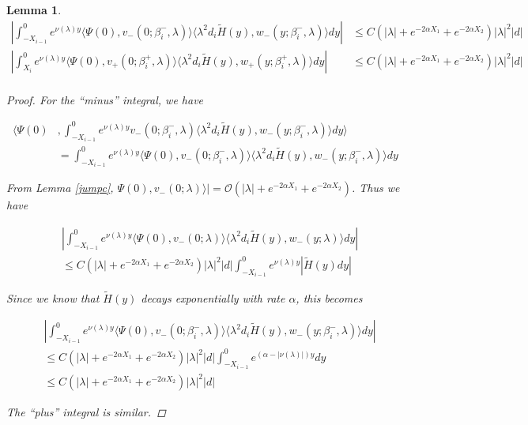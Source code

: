 \documentclass[12pt]{article}
\newtheorem{lemma}{Lemma}
\begin{document}
\begin{lemma}

\begin{align*}
\left| \int_{-X_{i-1}}^0
e^{\nu(\lambda)y} \langle \Psi(0), v_-(0; \beta_i^-, \lambda) \rangle \langle \lambda^2 d_i \tilde{H}(y), w_-(y; \beta_i^-, \lambda) \rangle dy \right| &\leq C (|\lambda| + e^{-2 \alpha X_1} + e^{-2 \alpha X_2} ) |\lambda|^2 |d|\\
\left| \int_{X_i}^0
e^{\nu(\lambda)y} \langle \Psi(0), v_+(0; \beta_i^+, \lambda) \rangle \langle \lambda^2 d_i \tilde{H}(y), w_+(y; \beta_i^+,\lambda) \rangle dy \right| &\leq C (|\lambda| + e^{-2 \alpha X_1} + e^{-2 \alpha X_2} ) |\lambda|^2  |d| \\
\end{align*}

\begin{proof}

For the ``minus'' integral, we have

\begin{align*}
\langle \Psi(0) &, \int_{-X_{i-1}}^0
e^{\nu(\lambda)y} v_-(0; \beta_i^-, \lambda) \langle \lambda^2 d_i \tilde{H}(y), w_-(y; \beta_i^-, \lambda) \rangle dy \rangle \\
&= \int_{-X_{i-1}}^0
e^{\nu(\lambda)y} \langle \Psi(0), v_-(0; \beta_i^-, \lambda) \rangle \langle \lambda^2 d_i \tilde{H}(y), w_-(y; \beta_i^-, \lambda) \rangle dy 
\end{align*}

From Lemma \ref{jumpc}, $\Psi(0), v_-(0; \lambda) \rangle| = \mathcal{O}(|\lambda| + e^{-2 \alpha X_1} + e^{-2 \alpha X_2} )$. Thus we have

\begin{align*}
&\left| \int_{-X_{i-1}}^0
e^{\nu(\lambda)y} \langle \Psi(0), v_-(0; \lambda) \rangle \langle \lambda^2 d_i \tilde{H}(y), w_-(y; \lambda) \rangle dy \right| \\
&\leq C (|\lambda| + e^{-2 \alpha X_1} + e^{-2 \alpha X_2} ) |\lambda|^2 |d| 
\int_{-X_{i-1}}^0 e^{\nu(\lambda)y} |\tilde{H}(y) dy|
\end{align*}

Since we know that $\tilde{H}(y)$ decays exponentially with rate $\alpha$, this becomes

\begin{align*}
&\left| \int_{-X_{i-1}}^0
e^{\nu(\lambda)y} \langle \Psi(0), v_-(0; \beta_i^-, \lambda) \rangle \langle \lambda^2 d_i \tilde{H}(y), w_-(y; \beta_i^-, \lambda) \rangle dy \right| \\
&\leq C (|\lambda| + e^{-2 \alpha X_1} + e^{-2 \alpha X_2} ) |\lambda|^2  |d| 
\int_{-X_{i-1}}^0 e^{(\alpha - |\nu(\lambda)|)y} dy \\
&\leq C (|\lambda| + e^{-2 \alpha X_1} + e^{-2 \alpha X_2} ) |\lambda|^2  |d|
\end{align*}

The ``plus'' integral is similar.

\end{proof} 
\end{lemma}
\end{document}
